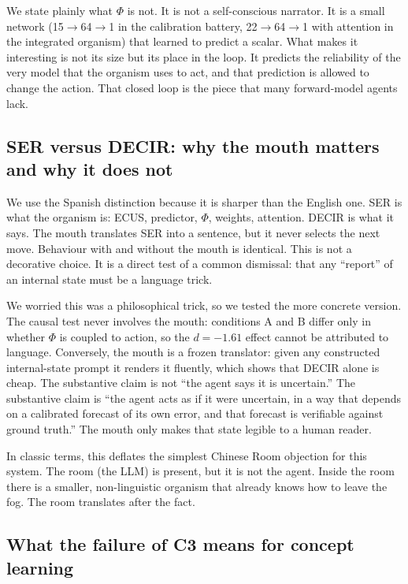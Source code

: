 \documentclass[11pt,a4paper]{article}
\begin{document}
We state plainly what $\Phi$ is not. It is not a self-conscious narrator. It is a small network (15$\rightarrow$64$\rightarrow$1 in the calibration battery, 22$\rightarrow$64$\rightarrow$1 with attention in the integrated organism) that learned to predict a scalar. What makes it interesting is not its size but its place in the loop. It predicts the reliability of the very model that the organism uses to act, and that prediction is allowed to change the action. That closed loop is the piece that many forward-model agents lack.

\subsection{SER versus DECIR: why the mouth matters and why it does not}

We use the Spanish distinction because it is sharper than the English one. SER is what the organism is: ECUS, predictor, $\Phi$, weights, attention. DECIR is what it says. The mouth translates SER into a sentence, but it never selects the next move. Behaviour with and without the mouth is identical. This is not a decorative choice. It is a direct test of a common dismissal: that any ``report'' of an internal state must be a language trick.

We worried this was a philosophical trick, so we tested the more concrete version. The causal test never involves the mouth: conditions A and B differ only in whether $\Phi$ is coupled to action, so the $d=-1.61$ effect cannot be attributed to language. Conversely, the mouth is a frozen translator: given any constructed internal-state prompt it renders it fluently, which shows that DECIR alone is cheap. The substantive claim is not ``the agent says it is uncertain.'' The substantive claim is ``the agent acts as if it were uncertain, in a way that depends on a calibrated forecast of its own error, and that forecast is verifiable against ground truth.'' The mouth only makes that state legible to a human reader.

In classic terms, this deflates the simplest Chinese Room objection for this system. The room (the LLM) is present, but it is not the agent. Inside the room there is a smaller, non-linguistic organism that already knows how to leave the fog. The room translates after the fact.

\subsection{What the failure of C3 means for concept learning}
\end{document}
